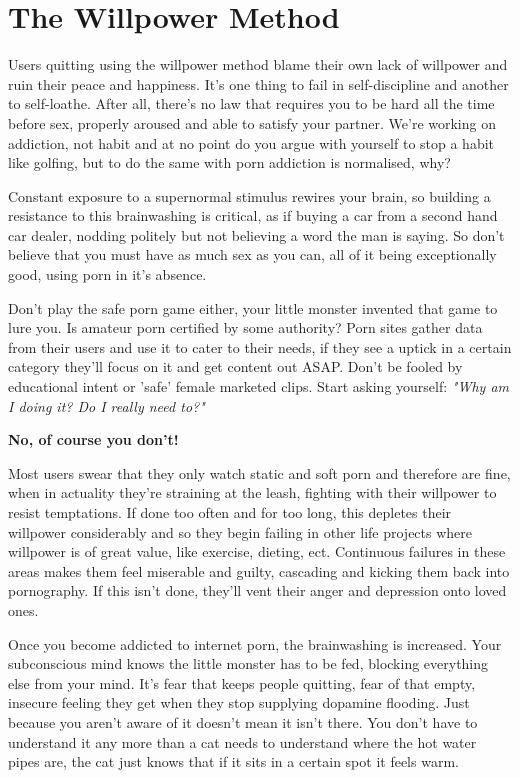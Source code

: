\documentclass[easypeasy.tex]{subfiles}
\begin{document}
\section{The Willpower Method}
Users quitting using the willpower method blame their own lack of willpower and ruin their peace and happiness. It's one thing to fail in self-discipline and another to self-loathe. After all, there's no law that requires you to be hard all the time before sex, properly aroused and able to satisfy your partner. We're working on addiction, not habit and at no point do you argue with yourself to stop a habit like golfing, but to do the same with porn addiction is normalised, why?

Constant exposure to a supernormal stimulus rewires your brain, so building a resistance to this brainwashing is critical, as if buying a car from a second hand car dealer, nodding politely but not believing a word the man is saying. So don't believe that you must have as much sex as you can, all of it being exceptionally good, using porn in it's absence.

Don't play the safe porn game either, your little monster invented that game to lure you. Is amateur porn certified by some authority? Porn sites gather data from their users and use it to cater to their needs, if they see a uptick in a certain category they'll focus on it and get content out ASAP. Don't be fooled by educational intent or 'safe' female marketed clips. Start asking yourself: \textit{"Why am I doing it? Do I really need to?"}

\textbf{No, of course you don't!}

Most users swear that they only watch static and soft porn and therefore are fine, when in actuality they're straining at the leash, fighting with their willpower to resist temptations. If done too often and for too long, this depletes their willpower considerably and so they begin failing in other life projects where willpower is of great value, like exercise, dieting, ect. Continuous failures in these areas makes them feel miserable and guilty, cascading and kicking them back into pornography. If this isn't done, they'll vent their anger and depression onto loved ones.

Once you become addicted to internet porn, the brainwashing is increased. Your subconscious mind knows the little monster has to be fed, blocking everything else from your mind. It's fear that keeps people quitting, fear of that empty, insecure feeling they get when they stop supplying dopamine flooding. Just because you aren't aware of it doesn't mean it isn't there. You don't have to understand it any more than a cat needs to understand where the hot water pipes are, the cat just knows that if it sits in a certain spot it feels warm.
\end{document}
